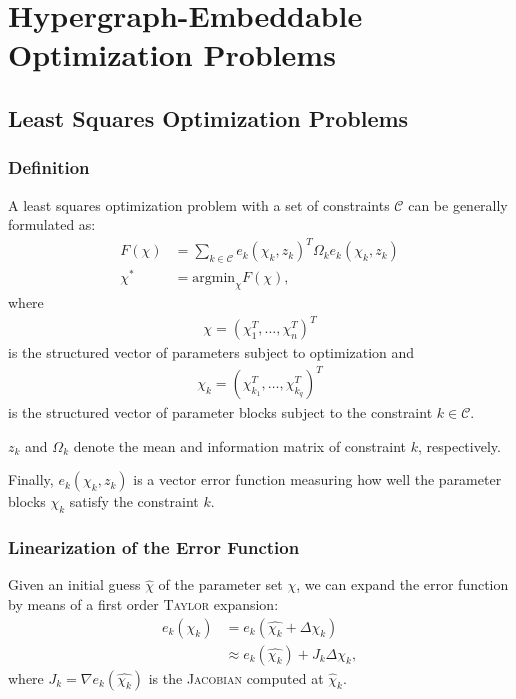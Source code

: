 \section{Hypergraph-Embeddable Optimization Problems}\label{sec:hypergraph-embeddableOptimizationProblems}

\subsection{Least Squares Optimization Problems}\label{subsec:leastSquaresOptimizationProblems}

\subsubsection{Definition}
A least squares optimization problem with a set of constraints $\mathcal{C}$ can be generally formulated as:
\begin{align}
    \label{formulation}
    F(\chi) &= \sum_{k\in\mathcal{C}}e_k(\chi_k, z_k)^{T}\Omega_k e_k(\chi_k, z_k)\\
    {\chi}^* &= \text{argmin}_{\chi} F(\chi),
\end{align}
where
\begin{align}
    \chi = (\chi_1^T,\dots,\chi_n^T)^T
\end{align}
is the structured vector of parameters subject to optimization and
\begin{align}
    \chi_k = (\chi_{k_1}^T,\dots,\chi_{k_q}^T)^T
\end{align}
is the structured vector of parameter blocks subject to the constraint $k\in\mathcal{C}$.

$z_k$ and $\Omega_k$ denote the mean and information matrix of constraint $k$, respectively.

Finally, $e_k(\chi_k, z_k)$ is a vector error function measuring how well the parameter blocks
$\chi_k$ satisfy the constraint $k$.

\subsubsection{Linearization of the Error Function}
Given an initial guess $\hat{\chi}$ of the parameter set $\chi$, we can expand the error function
by means of a first order \textsc{Taylor} expansion:
\begin{align}
    e_k(\chi_k) &= e_k(\hat{\chi_k}+\Delta\chi_k)\\
    &\approx e_k(\hat{\chi_k})+J_{k}\Delta\chi_k,
\end{align}
where $J_{k}=\nabla e_k(\hat{\chi_k})$ is the \textsc{Jacobian} computed at $\hat{\chi}_k$.

